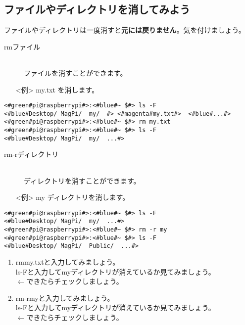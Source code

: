 \subsection{ファイルやディレクトリを消してみよう}
ファイルやディレクトリは一度消すと\textbf{元には戻りません}。気を付けましょう。
\begin{description}
\item[rm\textvisiblespace ファイル]\mbox{}\\
ファイルを消すことができます。
\end{description}
\begin{itemize}
\item[<例>]my.txt を消します。
\end{itemize}
\begin{lstlisting}[caption=cpの例, label=cp]
<#green#pi@raspberrypi#>:<#blue#~ $#> ls -F
<#blue#Desktop/	MagPi/	my/	 #>	<#magenta#my.txt#>	<#blue#...#>
<#green#pi@raspberrypi#>:<#blue#~ $#> rm my.txt
<#green#pi@raspberrypi#>:<#blue#~ $#> ls -F
<#blue#Desktop/	MagPi/	my/	 ...#>
\end{lstlisting}
\begin{description}
\item[rm\textvisiblespace -r\textvisiblespace ディレクトリ]\mbox{}\\
ディレクトリを消すことができます。
\end{description}
\begin{itemize}
\item[<例>]my ディレクトリを消します。
\end{itemize}
\begin{lstlisting}[caption=cp -rの例, label=cp-R]
<#green#pi@raspberrypi#>:<#blue#~ $#> ls -F
<#blue#Desktop/	MagPi/	my/	 ...#>
<#green#pi@raspberrypi#>:<#blue#~ $#> rm -r my
<#green#pi@raspberrypi#>:<#blue#~ $#> ls -F
<#blue#Desktop/	MagPi/	Public/	 ...#>
\end{lstlisting}
\begin{tcolorbox}[title=\useOmetoi]
\begin{enumerate}
\item rm\textvisiblespace my.txtと入力してみましょう。\\
ls\textvisiblespace -Fと入力してmyディレクトリが消えているか見てみましょう。\\
\fbox{\phantom{白}} $\leftarrow$できたらチェックしましょう。
\item rm\textvisiblespace -r\textvisiblespace myと入力してみましょう。\\
ls\textvisiblespace -Fと入力してmyディレクトリが消えているか見てみましょう。\\
\fbox{\phantom{白}} $\leftarrow$できたらチェックしましょう。
\end{enumerate}
\end{tcolorbox}